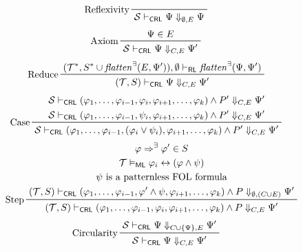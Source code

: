 \documentclass{article}
\newcommand{\RL}{\mathsf{RL}}
\newcommand{\ML}{\mathsf{ML}}
\newcommand{\CRL}{\mathsf{CRL}}
\begin{document}
\begin{figure}
    \centering
    \begin{align*}
    & \prftree[l]{Reflexivity}{\mathcal{S} \vdash_\CRL \Psi \Downarrow_{\emptyset,E} \Psi}
    \end{align*}
    \begin{align*}
    & \prftree[l]{Axiom}{\Psi \in E}{\mathcal{S} \vdash_\CRL \Psi \Downarrow_{C,E} \Psi^\prime}
    \end{align*}
    \begin{align*}
    & \prftree[l]{Reduce}
      {(\mathcal{T}^*, S^* \cup \mathit{flatten}^\exists(E, \Psi^\prime)), \emptyset \vdash_\RL
        \mathit{flatten}^\exists(\Psi, \Psi^\prime) }
      {(\mathcal{T}, S) \vdash_\CRL \Psi \Downarrow_{C,E} \Psi^\prime}
    \end{align*}
    \begin{align*}
    & \prftree[l]{Case}
    { \prfStackPremises
      {\mathcal{S} \vdash_\CRL (\varphi_1, \ldots, \varphi_{i-1}, \varphi_i, \varphi_{i+1}, \ldots, \varphi_k) \land P^\prime \Downarrow_{C, E} \Psi^\prime }
      {\mathcal{S} \vdash_\CRL (\varphi_1, \ldots, \varphi_{i-1}, \psi_i, \varphi_{i+1}, \ldots, \varphi_k) \land P^\prime \Downarrow_{C, E} \Psi^\prime }
    }
    {\mathcal{S} \vdash_\CRL (\varphi_1, \ldots, \varphi_{i-1}, (\varphi_i \lor \psi_i), \varphi_{i+1}, \ldots, \varphi_k) \land P^\prime \Downarrow_{C, E} \Psi^\prime}
    \end{align*}
    \begin{align*}
    & \prftree[l]{Step}
    { \prfStackPremises
       {\varphi \Rightarrow^\exists \varphi^\prime \in S}
       {\mathcal{T} \vDash_\ML \varphi_i \leftrightarrow (\varphi \land \psi)}
       {\psi \mbox{ is a patternless FOL formula}}
       {  (\mathcal{T}, S) \vdash_\CRL (\varphi_1, \ldots, \varphi_{i-1}, \varphi^\prime \land \psi, \varphi_{i+1}, \ldots, \varphi_k)
          \land P
          \Downarrow_{\emptyset, (C \cup E)} \Psi^\prime
      }
    }
    {(\mathcal{T}, S) \vdash_\CRL (\varphi_1, \ldots, \varphi_{i-1}, \varphi_i, \varphi_{i+1}, \ldots, \varphi_k) \land P \Downarrow_{C, E} \Psi^\prime}
    \end{align*}
    \begin{align*}
    & \prftree[l]{Circularity}
      { \mathcal{S} \vdash_\CRL \Psi \Downarrow_{C \cup \{ \Psi \} , E} \Psi^\prime}
      { \mathcal{S} \vdash_\CRL \Psi \Downarrow_{C, E} \Psi^\prime}
    \end{align*}

\end{figure}
\end{document}
